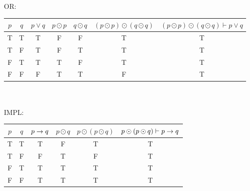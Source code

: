 \documentclass[12pt,oneside,reqno]{amsart}
\begin{document}
OR:\\
	\begin{tabular}{ cc|c|c|c|c|c }
		$p$ & $q$ & $p \lor q$ & $p \odot p$ & $q \odot q$ & $(p \odot p) \odot (q \odot q)$ & $(p \odot p) \odot (q \odot q) \vdash p\lor q$ \\ \hline
		T & T & 	T & F & F & T & T \\
		T & F & 	T & F & T & T & T \\
		F & T & 	T & T & F & T & T \\
		F & F & 	F & T & T & F & T \\
	\end{tabular}\\\\

IMPL:\\
	\begin{tabular}{ cc|c|c|c|c }
		$p$ & $q$ & $p \rightarrow{} q$ & $ p \odot q$ & $p \odot (p \odot q)$ & $p \odot (p \odot q) \vdash p \rightarrow{} q$ \\ \hline
		T & T & 	T & F & T & T \\
		T & F & 	F & T & F & T \\
		F & T & 	T & T & T & T \\
		F & F & 	T & T & T & T \\
	\end{tabular}\\\\
\end{document}
